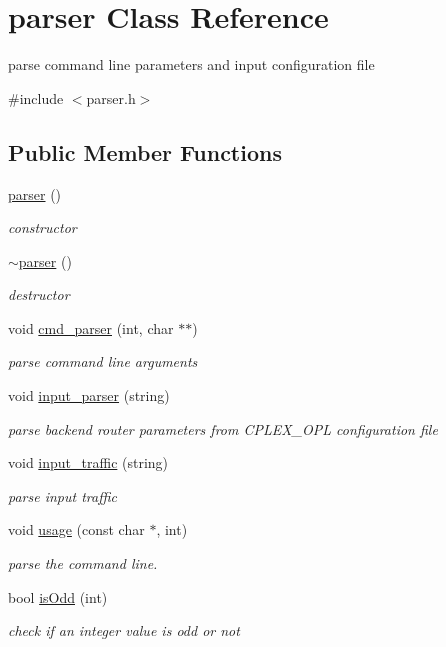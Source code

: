 \hypertarget{classparser}{\section{parser \-Class \-Reference}
\label{classparser}
}


parse command line parameters and input configuration file  




{\ttfamily \#include $<$parser.\-h$>$}

\subsection*{\-Public \-Member \-Functions}
\begin{DoxyCompactItemize}
\item 
\hyperlink{classparser_ac4cb16e924a735dfb5837772afa1a1a9}{parser} ()
\begin{DoxyCompactList}\small\item\em constructor \end{DoxyCompactList}\item 
\hyperlink{classparser_acdd4eb1b51b876954c2f7605f65388ce}{$\sim$parser} ()
\begin{DoxyCompactList}\small\item\em destructor \end{DoxyCompactList}\item 
void \hyperlink{classparser_ac578bbb7b49c579bc4520a806fb316c5}{cmd\-\_\-parser} (int, char $\ast$$\ast$)
\begin{DoxyCompactList}\small\item\em parse command line arguments \end{DoxyCompactList}\item 
void \hyperlink{classparser_a4bcf9f11cfbb793a414221fafd4c4a7d}{input\-\_\-parser} (string)
\begin{DoxyCompactList}\small\item\em parse backend router parameters from \-C\-P\-L\-E\-X\-\_\-\-O\-P\-L configuration file \end{DoxyCompactList}\item 
void \hyperlink{classparser_a30a37d82f9894b3c725e2dd1daa0234f}{input\-\_\-traffic} (string)
\begin{DoxyCompactList}\small\item\em parse input traffic \end{DoxyCompactList}\item 
void \hyperlink{classparser_a6e2620bd81e91a69dc479f307c8b8b72}{usage} (const char $\ast$, int)
\begin{DoxyCompactList}\small\item\em parse the command line. \end{DoxyCompactList}\item 
bool \hyperlink{classparser_a8afa4de9b61d1d11a85de1c00041e69b}{is\-Odd} (int)
\begin{DoxyCompactList}\small\item\em check if an integer value is odd or not \end{DoxyCompactList}\end{DoxyCompactItemize}


